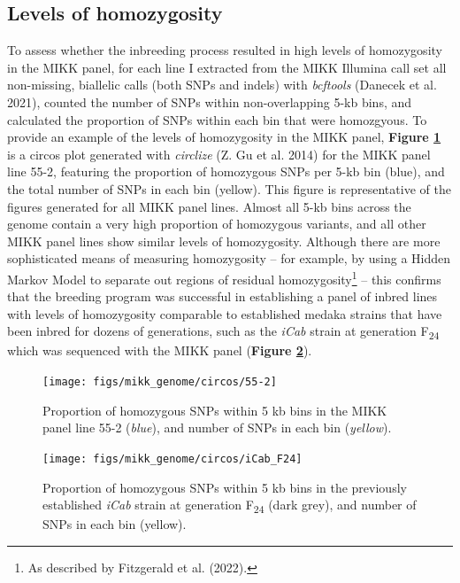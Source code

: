 \documentclass[
]{book}
\begin{document}
\hypertarget{levels-of-homozygosity}{%
\subsection{Levels of homozygosity}\label{levels-of-homozygosity}}

To assess whether the inbreeding process resulted in high levels of homozygosity in the MIKK panel, for each line I extracted from the MIKK Illumina call set all non-missing, biallelic calls (both SNPs and indels) with \emph{bcftools} (Danecek et al. 2021), counted the number of SNPs within non-overlapping 5-kb bins, and calculated the proportion of SNPs within each bin that were homozgyous. To provide an example of the levels of homozygosity in the MIKK panel, \textbf{Figure \ref{fig:circos-55-2}} is a circos plot generated with \emph{circlize} (Z. Gu et al. 2014) for the MIKK panel line 55-2, featuring the proportion of homozygous SNPs per 5-kb bin (blue), and the total number of SNPs in each bin (yellow). This figure is representative of the figures generated for all MIKK panel lines. Almost all 5-kb bins across the genome contain a very high proportion of homozygous variants, and all other MIKK panel lines show similar levels of homozygosity. Although there are more sophisticated means of measuring homozygosity -- for example, by using a Hidden Markov Model to separate out regions of residual homozygosity\footnote{As described by Fitzgerald et al. (2022).} -- this confirms that the breeding program was successful in establishing a panel of inbred lines with levels of homozygosity comparable to established medaka strains that have been inbred for dozens of generations, such as the \emph{iCab} strain at generation F\textsubscript{24} which was sequenced with the MIKK panel (\textbf{Figure \ref{fig:circos-iCab-F24}}).



\begin{figure}
\texttt{[image: figs/mikk\_genome/circos/55-2]} \caption{Proportion of homozygous SNPs within 5 kb bins in the MIKK panel line 55-2 (\emph{blue}), and number of SNPs in each bin (\emph{yellow}).}\label{fig:circos-55-2}
\end{figure}



\begin{figure}
\texttt{[image: figs/mikk\_genome/circos/iCab\_F24]} \caption{Proportion of homozygous SNPs within 5 kb bins in the previously established \emph{iCab} strain at generation F\textsubscript{24} (dark grey), and number of SNPs in each bin (yellow).}\label{fig:circos-iCab-F24}
\end{figure}
\end{document}

